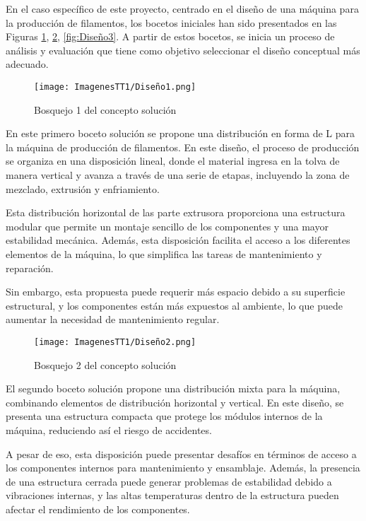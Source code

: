 \documentclass[14pt,oneside]{extarticle} %
\begin{document}
En el caso específico de este proyecto, centrado en el diseño de una máquina para la producción de filamentos, los bocetos iniciales han sido presentados en las Figuras \ref{fig:Diseño1}, \ref{fig:Diseño2}, \ref{fig:Diseño3}. A partir de estos bocetos, se inicia un proceso de análisis y evaluación que tiene como objetivo seleccionar el diseño conceptual más adecuado. 

\begin{figure}[H]
    \centering
    \texttt{[image: ImagenesTT1/Diseño1.png]}
    \caption{Bosquejo 1 del concepto solución}
    \label{fig:Diseño1}
\end{figure}

En este primero boceto solución se propone una distribución en forma de L para la máquina de producción de filamentos. En este diseño, el proceso de producción se organiza en una disposición lineal, donde el material ingresa en la tolva de manera vertical y avanza a través de una serie de etapas, incluyendo la zona de mezclado, extrusión y enfriamiento. 

Esta distribución horizontal de las parte extrusora proporciona una estructura modular que permite un montaje sencillo de los componentes y una mayor estabilidad mecánica. Además, esta disposición facilita el acceso a los diferentes elementos de la máquina, lo que simplifica las tareas de mantenimiento y reparación. 

\newpage
Sin embargo, esta propuesta puede requerir más espacio debido a su superficie estructural, y los componentes están más expuestos al ambiente, lo que puede aumentar la necesidad de mantenimiento regular.

\begin{figure}[H]
    \centering
    \texttt{[image: ImagenesTT1/Diseño2.png]}
    \caption{Bosquejo 2 del concepto solución}
    \label{fig:Diseño2}
\end{figure}

El segundo boceto solución propone una distribución mixta para la máquina, combinando elementos de distribución horizontal y vertical. En este diseño, se presenta una estructura compacta que protege los módulos internos de la máquina, reduciendo así el riesgo de accidentes. 

A pesar de eso, esta disposición puede presentar desafíos en términos de acceso a los componentes internos para mantenimiento y ensamblaje. Además, la presencia de una estructura cerrada puede generar problemas de estabilidad debido a vibraciones internas, y las altas temperaturas dentro de la estructura pueden afectar el rendimiento de los componentes.
\end{document}

